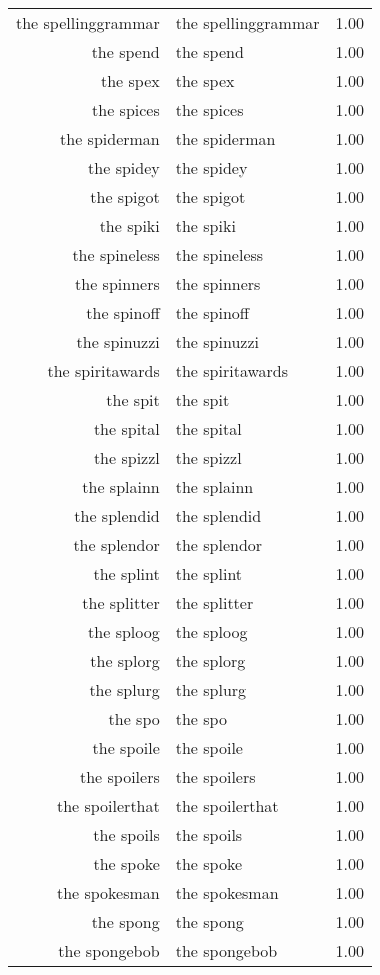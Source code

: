 \begin{table}[ht]
\begin{tabular}{rlr}
  the spellinggrammar & the spellinggrammar & 1.00 \\ 
  the spend & the spend & 1.00 \\ 
  the spex & the spex & 1.00 \\ 
  the spices & the spices & 1.00 \\ 
  the spiderman & the spiderman & 1.00 \\ 
  the spidey & the spidey & 1.00 \\ 
  the spigot & the spigot & 1.00 \\ 
  the spiki & the spiki & 1.00 \\ 
  the spineless & the spineless & 1.00 \\ 
  the spinners & the spinners & 1.00 \\ 
  the spinoff & the spinoff & 1.00 \\ 
  the spinuzzi & the spinuzzi & 1.00 \\ 
  the spiritawards & the spiritawards & 1.00 \\ 
  the spit & the spit & 1.00 \\ 
  the spital & the spital & 1.00 \\ 
  the spizzl & the spizzl & 1.00 \\ 
  the splainn & the splainn & 1.00 \\ 
  the splendid & the splendid & 1.00 \\ 
  the splendor & the splendor & 1.00 \\ 
  the splint & the splint & 1.00 \\ 
  the splitter & the splitter & 1.00 \\ 
  the sploog & the sploog & 1.00 \\ 
  the splorg & the splorg & 1.00 \\ 
  the splurg & the splurg & 1.00 \\ 
  the spo & the spo & 1.00 \\ 
  the spoile & the spoile & 1.00 \\ 
  the spoilers & the spoilers & 1.00 \\ 
  the spoilerthat & the spoilerthat & 1.00 \\ 
  the spoils & the spoils & 1.00 \\ 
  the spoke & the spoke & 1.00 \\ 
  the spokesman & the spokesman & 1.00 \\ 
  the spong & the spong & 1.00 \\ 
  the spongebob & the spongebob & 1.00 \\ 

\end{tabular}
\end{table}
